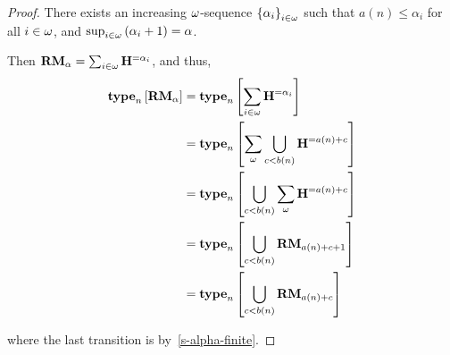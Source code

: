 \begin{proof}
    There exists an increasing $\omega$-sequence $\left\{ {\alpha_i} \right\}_{i \in \omega}$ such that
    $a(n) \le \alpha_i$ for all $i \in \omega$,
    and $\sup_{i \in \omega} \left( {\alpha_i + 1} \right) = \alpha$.

    Then $\mathbf{RM}_{\alpha} = \sum_{i \in \omega} \mathbf{H}_{}^{= \alpha_i}$,
    and thus,
    \begin{align*}
        \mathbf{type}_{n} \left[ {\mathbf{RM}_{\alpha}} \right]
         & = \mathbf{type}_{n} \left[ {\sum_{i \in \omega} \mathbf{H}_{}^{= \alpha_i}} \right]                \\
         & = \mathbf{type}_{n} \left[ {\sum_{\omega} \bigcup_{c < b(n)}{\mathbf{H}_{}^{= a(n) + c}}} \right]  \\
         & = \mathbf{type}_{n} \left[ {\bigcup_{c < b(n)}{\sum_{\omega} \mathbf{H}_{}^{= a(n) + c}}} \right]  \\
         & = \mathbf{type}_{n} \left[ {\bigcup_{c < b(n)}{\mathbf{RM}_{a(n) + c + 1}}} \right] \\
         & = \mathbf{type}_{n} \left[ {\bigcup_{c < b(n)}{\mathbf{RM}_{a(n) + c}}} \right]     \\
    \end{align*}

    where the last transition is by~\cref{s-alpha-finite}.

\end{proof}
